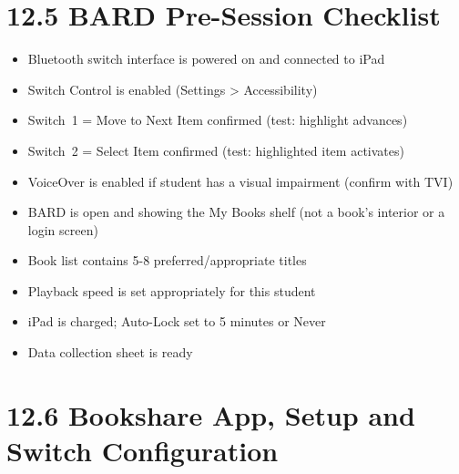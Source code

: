\documentclass[justified,openright]{tufte-book}
\DeclareRobustCommand{\checkbox}{\(\square\)}
\begin{document}

\section{12.5 BARD Pre-Session
Checklist}\label{bard-pre-session-checklist}

\begin{itemize}

\item[\checkbox] 
Bluetooth switch interface is powered on and connected to iPad
\item[\checkbox] 
Switch Control is enabled (Settings \textgreater{} Accessibility)
\item[\checkbox] 
Switch~1 = Move to Next Item confirmed (test: highlight advances)
\item[\checkbox] 
Switch~2 = Select Item confirmed (test: highlighted item activates)
\item[\checkbox] 
VoiceOver is enabled if student has a visual impairment (confirm with
  TVI)
\item[\checkbox] 
BARD is open and showing the My Books shelf (not a book's interior
  or a login screen)
\item[\checkbox] 
Book list contains 5-8 preferred/appropriate titles
\item[\checkbox] 
Playback speed is set appropriately for this student
\item[\checkbox] 
iPad is charged; Auto-Lock set to 5 minutes or Never
\item[\checkbox] 
Data collection sheet is ready
\end{itemize}

\section{12.6 Bookshare App, Setup and Switch
Configuration}\label{bookshare-setup}

\end{document}
